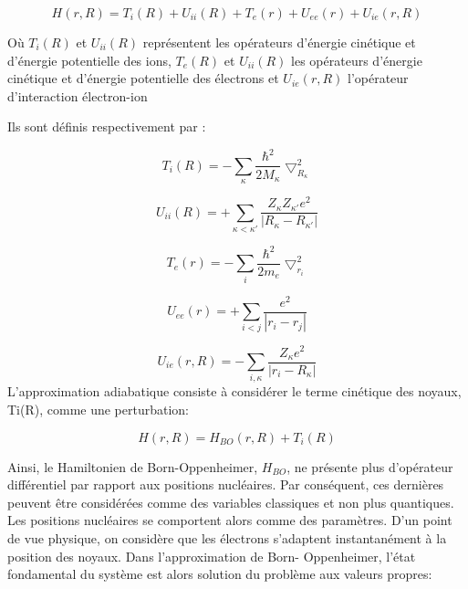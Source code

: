 \begin{equation}
H(r,R) = T_{i}(R) + U_{ii}(R) + T_{e}(r) + U_{ee}(r)+ U_{ie}(r,R)
\end{equation}

Où $T_{i}(R)$ et $U_{ii}(R)$ représentent les opérateurs d'énergie cinétique et d'énergie potentielle des ions, $T_{e}(R)$ et $U_{ii}(R)$ les opérateurs d'énergie cinétique et d'énergie potentielle des électrons et $U_{ie}(r,R)$ l'opérateur d'interaction électron-ion

Ils sont définis respectivement par :

\begin{equation}
T_{i}(R) = -\sum_{\kappa} \frac{\hbar^{2}}{2M_{\kappa}} \bigtriangledown^{2}_{R_{\kappa}}
\end{equation}

\begin{equation}
U_{ii}(R)= + \sum_{\kappa<\kappa'} \frac{Z_{\kappa}Z_{\kappa'}e^{2}}{|R_{\kappa}-R_{\kappa'}|}
\end{equation}

\begin{equation}
T_{e}(r) = -\sum_{i} \frac{\hbar^{2}}{2m_{e}} \bigtriangledown^{2}_{r_{i}}
\end{equation}

\begin{equation}
U_{ee}(r)= + \sum_{i<j} \frac{e^{2}}{|r_{i}-r_{j}|}
\end{equation}

\begin{equation}
U_{ie} (r,R) = -\sum_{i,\kappa} \frac{Z_{\kappa}e^{2}}{|r_{i}-R_{\kappa}|}
\end{equation}
L'approximation adiabatique consiste à considérer le terme cinétique des noyaux, Ti(R), comme une perturbation:

\begin{equation}
H(r,R) = H_{BO}(r,R) + T_{i}(R)
\end{equation}

Ainsi, le Hamiltonien de Born-Oppenheimer, $H_{BO}$, ne présente plus d'opérateur différentiel par rapport aux positions nucléaires. Par conséquent, ces dernières peuvent être considérées comme des variables classiques et non plus quantiques. Les positions nucléaires se comportent alors comme des paramètres. D'un point de vue physique, on considère que les électrons s'adaptent instantanément à la position des noyaux. Dans l'approximation de Born- Oppenheimer, l'état fondamental du système est alors solution du problème aux valeurs propres:

